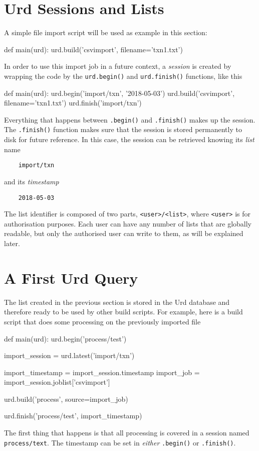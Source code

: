 \section{Urd Sessions and Lists}
A simple file import script will be used as example in this section:
\begin{python}
def main(urd):
    urd.build('csvimport', filename='txn1.txt')
\end{python}
In order to use this import job in a future context,
a \textsl{session} is created by wrapping the code by
the \texttt{urd.begin()} and \texttt{urd.finish()} functions, like this
\begin{python}
def main(urd):
    urd.begin('import/txn', '2018-05-03')
    urd.build('csvimport', filename='txn1.txt')
    urd.finish('import/txn')
\end{python}
Everything that happens between \texttt{.begin()} and \texttt{.finish()}
makes up the session.  The \texttt{.finish()} function makes sure that
the session is stored permanently to disk for future reference.  In
this case, the session can be retrieved knowing its \textsl{list} name
\begin{verbatim}
    import/txn
\end{verbatim}
and its \textsl{timestamp}
\begin{verbatim}
    2018-05-03
\end{verbatim}
The list identifier is composed of two parts, \texttt{<user>/<list>}, where
\texttt{<user>} is for authorisation purposes.  Each user can
have any number of lists that are globally readable, but only the
authorised user can write to them, as will be explained later.



\section{A First Urd Query}
The list created in the previous section is stored in the Urd database
and therefore ready to be used by other build scripts.  For example,
here is a build script that does some processing on the previously
imported file
\begin{python}
def main(urd):
    urd.begin('process/test')

    import_session = urd.latest('import/txn')

    import_timestamp = import_session.timestamp
    import_job       = import_session.joblist['csvimport']

    urd.build('process', source=import_job)

    urd.finish('process/test', import_timestamp)
\end{python}
The first thing that happens is that all processing is covered in a
session named \texttt{process/text}.  The timestamp can be set
in \textsl{either} \texttt{.begin()} or \texttt{.finish()}.


